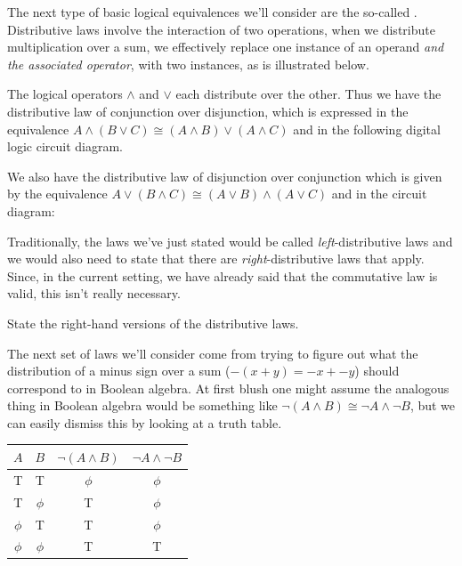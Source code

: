 The next type of basic logical equivalences we'll consider are the
so-called .  
Distributive laws involve the 
interaction of two operations, when we distribute multiplication 
over a sum, we effectively replace one instance of an operand {\em 
and the associated operator}, with two instances, as is illustrated
below.

\begin{center}

\end{center}   
  
The logical operators $\land$ and $\lor$ each distribute over the other.
Thus we have the distributive law of conjunction over disjunction, which
is expressed in the equivalence 
$A \land (B \lor C) \cong (A \land B) \lor (A \land C)$ 
and in the following digital logic circuit diagram.

\begin{center}

\end{center}   

We also have the distributive law of disjunction over conjunction 
which is given by the equivalence 
$A \lor (B \land C) \cong (A \lor B) \land (A \lor C)$ and in the 
circuit diagram:

\begin{center}

\end{center}   

Traditionally, the laws we've just stated would be called 
{\em left}-distributive laws and we would also need to state 
that there are {\em right}-distributive laws that apply.  Since,
in the current setting, we have already said that the commutative
law is valid, this isn't really necessary.

\begin{exer}
State the right-hand versions of the distributive laws.
\end{exer}

The next set of laws we'll consider come from trying to
figure out what the distribution of a minus sign over a sum
($-(x+y) = -x + -y$)
should correspond to in Boolean algebra.  At first blush one 
might assume the analogous thing in Boolean algebra would be
something like ${\lnot}(A \land B) \cong {\lnot}A \land {\lnot}B$,
but we can easily dismiss this by looking at a truth table.

\begin{center}
\begin{tabular}{c|c||c|c}
\; $A$ \; & \; $B$ \; & \; ${\lnot}(A \land B)$ \; & \; ${\lnot}A \land {\lnot}B$\; \\ \hline
T & T &  $\phi$ & $\phi$ \\
T & $\phi$ & T & $\phi$ \\
 $\phi$ & T & T & $\phi$ \\
 $\phi$ &  $\phi$  & T & T\\
\end{tabular}
\end{center}

